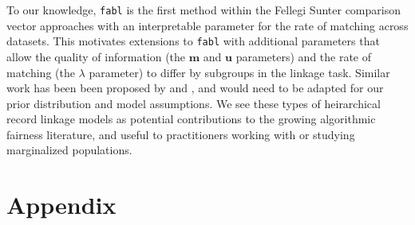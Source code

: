 \documentclass[ba]{imsart}
\begin{document}
To our knowledge, \texttt{fabl} is the first method within the Fellegi Sunter comparison vector approaches with an interpretable parameter for the rate of matching across datasets. This motivates extensions to \texttt{fabl} with additional parameters that allow the quality of information (the $\bm{m}$ and $\bm{u}$ parameters) and the rate of matching (the $\lambda$ parameter) to differ by subgroups in the linkage task. Similar work has been been proposed by \cite{heck2019} and \cite{larsen2005}, and would need to be adapted for our prior distribution and model assumptions. We see these types of heirarchical record linkage models as potential contributions to the growing algorithmic fairness literature, and useful to practitioners working with or studying marginalized populations. 












%


\section*{Appendix}
\label{sec:appendix}
\end{document}
